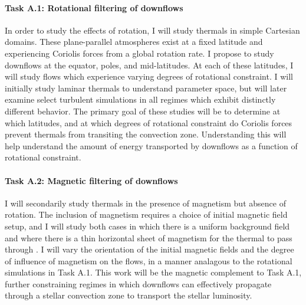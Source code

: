 \documentclass[11pt, preprint]{aastex}
\begin{document}
\paragraph{Task A.1: Rotational filtering of downflows}
\label{sct:taskA1}
In order to study the effects of rotation, I will study thermals in simple Cartesian domains.
These plane-parallel atmospheres exist at a fixed latitude and experiencing Coriolis forces from a global rotation rate.
I propose to study downflows at the equator, poles, and mid-latitudes.
At each of these latitudes, I will study flows which experience varying degrees of rotational constraint.
I will initially study laminar thermals to understand parameter space, but will later examine select turbulent simulations in all regimes which exhibit distinctly different behavior.
The primary goal of these studies will be to determine at which latitudes, and at which degrees of rotational constraint do Coriolis forces prevent thermals from transiting the convection zone.
Understanding this will help understand the amount of energy transported by downflows as a function of rotational constraint.

\paragraph{Task A.2: Magnetic filtering of downflows}
\label{sct:taskA2}
I will secondarily study thermals in the presence of magnetism but absence of rotation.
The inclusion of magnetism requires a choice of initial magnetic field setup, and I will study both cases in which there is a uniform background field and where there is a thin horizontal sheet of magnetism for the thermal to pass through \citep[as in][]{tobias&all1998}.
I will vary the orientation of the initial magnetic fields and the degree of influence of magnetism on the flows, in a manner analagous to the rotational simulations in Task A.1.
This work will be the magnetic complement to Task A.1, further constraining regimes in which downflows can effectively propagate through a stellar convection zone to transport the stellar luminosity.
\end{document}
